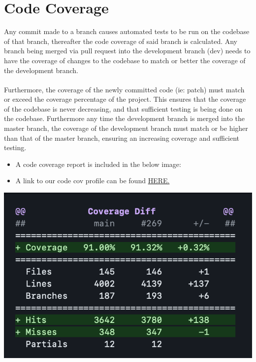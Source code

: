 \documentclass[12pt]{article}
\begin{document}
\section{Code Coverage}
Any commit made to a branch causes automated tests to be run on the codebase of that branch, thereafter the code coverage of said branch is calculated.
Any branch being merged via pull request into the development branch (dev) needs to have the coverage of changes to the codebase to match or better the coverage of the development branch.
\\\\Furthermore, the coverage of the newly committed code (ie: patch) must match or exceed the coverage percentage of the project.
This ensures that the coverage of the codebase is never decreasing, and that sufficient testing is being done on the codebase.
Furthermore any time the development branch is merged into the master branch, the coverage of the development branch must match or be higher than that of the master branch, ensuring an increasing coverage and sufficient testing.
\begin{itemize}
    \item A code coverage report is included in the below image:
    \item A link to our code cov profile can be found \href{https://codecov.io/gh/COS301-SE-2023/Domain-Pulse-A-Sentiment-Analysis-Platform}{HERE.}
\end{itemize}
\includegraphics[width=\textwidth]{codecovReport.png}

\newpage
\end{document}
